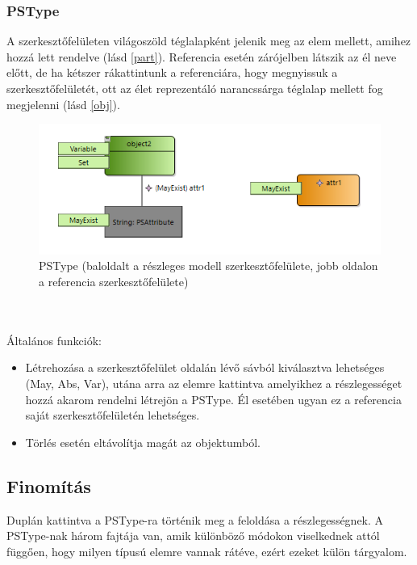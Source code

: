\subsubsection{PSType}
A szerkesztőfelületen világoszöld téglalapként jelenik meg az elem mellett, amihez hozzá lett rendelve (lásd \autoref{part}). Referencia esetén zárójelben látszik az él neve előtt, de ha kétszer rákattintunk a referenciára, hogy megnyissuk a szerkesztőfelületét, ott az élet reprezentáló narancssárga téglalap mellett fog megjelenni (lásd \autoref{obj}).
\begin{figure}[!ht]
	\centering
	\includegraphics{figures/part.png}
	\caption{PSType (baloldalt a részleges modell szerkesztőfelülete, jobb oldalon a referencia szerkesztőfelülete)}
	\label{part} 
\end{figure}
\\\\
Általános funkciók:
\begin{itemize}  	
	\item Létrehozása a szerkesztőfelület oldalán lévő sávból kiválasztva lehetséges (May, Abs, Var), utána arra az elemre kattintva amelyikhez a részlegességet hozzá akarom rendelni létrejön a PSType. Él esetében ugyan ez a referencia saját szerkesztőfelületén lehetséges.
	
	\item Törlés esetén eltávolítja magát az objektumból.
\end{itemize}

\subsection{Finomítás}
Duplán kattintva a PSType-ra történik meg a feloldása a részlegességnek. A PSType-nak három fajtája van, amik különböző módokon viselkednek attól függően, hogy milyen típusú elemre vannak rátéve, ezért ezeket külön tárgyalom. 

